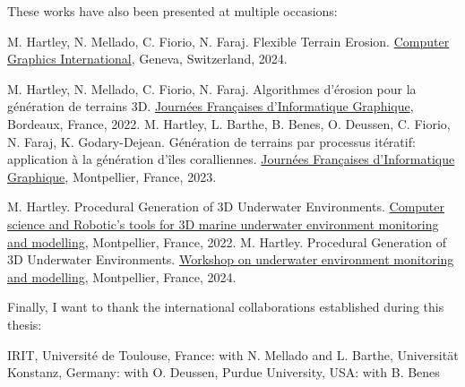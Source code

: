 These works have also been presented at multiple occasions:
\begin{Itemize}
    \Item{} M. Hartley, N. Mellado, C. Fiorio, N. Faraj. Flexible Terrain Erosion. \ul{Computer Graphics International}, Geneva, Switzerland, 2024.
\end{Itemize}
\begin{Itemize}
    \Item{} M. Hartley, N. Mellado, C. Fiorio, N. Faraj. Algorithmes d'érosion pour la génération de terrains 3D. \ul{Journées Françaises d'Informatique Graphique}, Bordeaux, France, 2022.
    \Item{} M. Hartley, L. Barthe, B. Benes, O. Deussen, C. Fiorio, N. Faraj, K. Godary-Dejean. Génération de terrains par processus itératif: application à la génération d'îles coralliennes. \ul{Journées Françaises d'Informatique Graphique}, Montpellier, France, 2023.
\end{Itemize}
\begin{Itemize}
    \Item{} M. Hartley. Procedural Generation of 3D Underwater Environments. \ul{Computer science and Robotic's tools for 3D marine underwater environment monitoring and modelling}, Montpellier, France, 2022.
    \Item{} M. Hartley. Procedural Generation of 3D Underwater Environments. \ul{Workshop on underwater environment monitoring and modelling}, Montpellier, France, 2024.
\end{Itemize}

Finally, I want to thank the international collaborations established during this thesis:
\begin{Itemize}
    \Item{} IRIT, Université de Toulouse, France: with N. Mellado and L. Barthe,
    \Item{} Universität Konstanz, Germany: with O. Deussen,
    \Item{} Purdue University, USA: with B. Benes
\end{Itemize}

